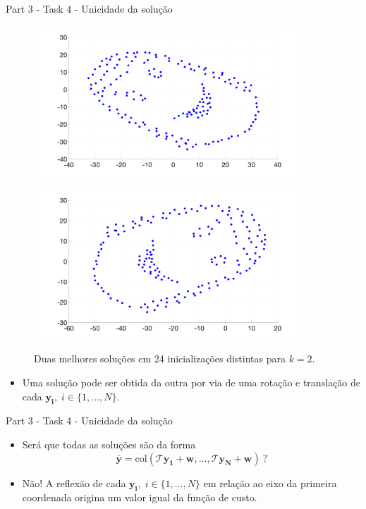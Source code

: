 \documentclass{beamer}					%
\begin{document}
\begin{frame}{Part 3 - Task 4 - Unicidade da solução}
\begin{figure}[ht]
	\centering
	\begin{minipage}[b]{0.5\textwidth}
		\centering
		\includegraphics[width=0.9\textwidth]{figures/task4_sol.png}
		\label{fig:task4_LM}
	\end{minipage}%
	\hfill
	\begin{minipage}[b]{0.5\textwidth}
		\centering
		\includegraphics[width=0.9\textwidth]{figures/task4_sol_2.png}
		\label{fig:task4_sol}
	\end{minipage}%
	\caption{Duas melhores soluções em 24 inicializações distintas para $k=2$.}
\end{figure}
\begin{itemize}
	\item Uma solução pode ser obtida da outra por via de uma rotação e translação de cada $\mathbf{y_i}, \; i \in \{1,\ldots,N\}$.
\end{itemize}
\end{frame}

\begin{frame}{Part 3 - Task 4 - Unicidade da solução}
	\begin{itemize}
		\item Será que todas as soluções são da forma 
		\begin{equation*}\label{key}
		\bar{\mathbf{y}} = \mathrm{col}(\mathcal{T}\mathbf{y_1}+\mathbf{w},\ldots,\mathcal{T}\mathbf{y_N}+\mathbf{w})\:?
		\end{equation*}
	\end{itemize}
	\begin{itemize}
	\item Não! A reflexão de cada $\mathbf{y_i}, \; i \in \{1,\ldots,N\}$ em relação ao eixo da primeira coordenada origina um valor igual da função de custo.
\end{itemize}
\end{frame}
\end{document}
